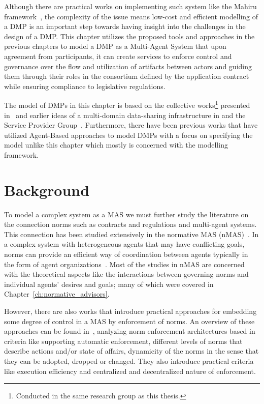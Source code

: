 Although there are practical works on implementing such system like the Mahiru framework~\cite{veen2022mahiru}, the complexity of the issue means low-cost and efficient modelling of a DMP is an important step towards having insight into the challenges in the design of a DMP. This chapter utilizes the proposed tools and approaches in the previous chapters to model a DMP as a Multi-Agent System that upon agreement from participants, it can create services to enforce control and governance over the flow and utilization of artifacts between actors and guiding them through their roles in the consortium defined by the application contract while ensuring compliance to legislative regulations. 

The model of DMPs in this chapter is based on the collective works\footnote{Conducted in the same research group as this thesis.} presented in~\cite{Zhang2019ModelingPlaces,Shakeri2019} and earlier ideas of a multi-domain data-sharing infrastructure in \cite{gommans@thesis} and the Service Provider Group~\cite{Gommans2014}. Furthermore, there have been previous works that have utilized Agent-Based approaches to model DMPs \cite{Deljoo2018APlaces,Zhou2020} with a focus on specifying the model unlike this chapter which mostly is concerned with the modelling framework.  


\section{Background}
To model a complex system as a MAS we must further study the literature on the connection norms such as contracts and regulations and multi-agent systems. This connection has been studied extensively in the normative MAS (nMAS)~\cite{Boella2006IntroductionSystems}. In a complex system with heterogeneous agents that may have conflicting goals, norms can provide an efficient way of coordination between agents typically in the form of agent organizations~\cite{luck2006normative}. Most of the studies in nMAS are concerned with the theoretical aspects like the interactions between governing norms and individual agents’ desires and goals; many of which were covered in Chapter~\ref{ch:normative_advisors}.

However, there are also works that introduce practical approaches for embedding some degree of control in a MAS by enforcement of norms. An overview of these approaches can be found in~\cite{criado2013manea}, analyzing norm enforcement architectures based in criteria like supporting automatic enforcement, different levels of norms that describe actions and/or state of affairs, dynamicity of the norms in the sense that they can be adopted, dropped or changed. They also introduce practical criteria like execution efficiency and centralized and decentralized nature of enforcement.

